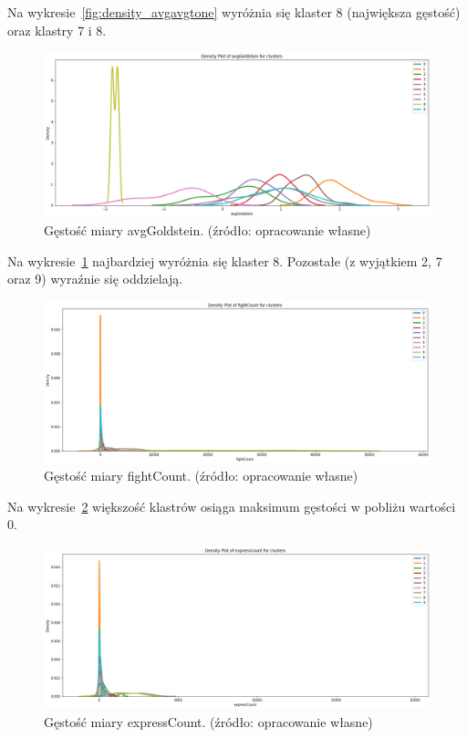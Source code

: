 \documentclass[11pt]{report}
\begin{document}
    Na wykresie~\ref{fig:density_avgavgtone} wyróżnia się klaster 8 (największa gęstość) oraz klastry 7 i 8.


    \begin{figure}[!htp]
        \centering
        \includegraphics[width=\linewidth]{fig/CLUST/density_avgGoldstein.png}
        \caption{Gęstość miary avgGoldstein. (źródło: opracowanie własne)}
        \label{fig:density_avggoldstein}
    \end{figure}

    Na wykresie~\ref{fig:density_avggoldstein} najbardziej wyróżnia się klaster 8.
    Pozostałe (z wyjątkiem 2, 7 oraz 9) wyraźnie się oddzielają.

    \begin{figure}[!htp]
        \centering
        \includegraphics[width=\linewidth]{fig/CLUST/density_fightCount.png}
        \caption{Gęstość miary fightCount. (źródło: opracowanie własne)}
        \label{tab:density_fightCount}
    \end{figure}

    Na wykresie~\ref{tab:density_fightCount} większość klastrów osiąga maksimum gęstości w pobliżu wartości 0.

    \begin{figure}[!htp]
        \centering
        \includegraphics[width=\linewidth]{fig/CLUST/density_expressCount.png}
        \caption{Gęstość miary expressCount. (źródło: opracowanie własne)}
        \label{fig:density_expresscount}
    \end{figure}
\end{document}
